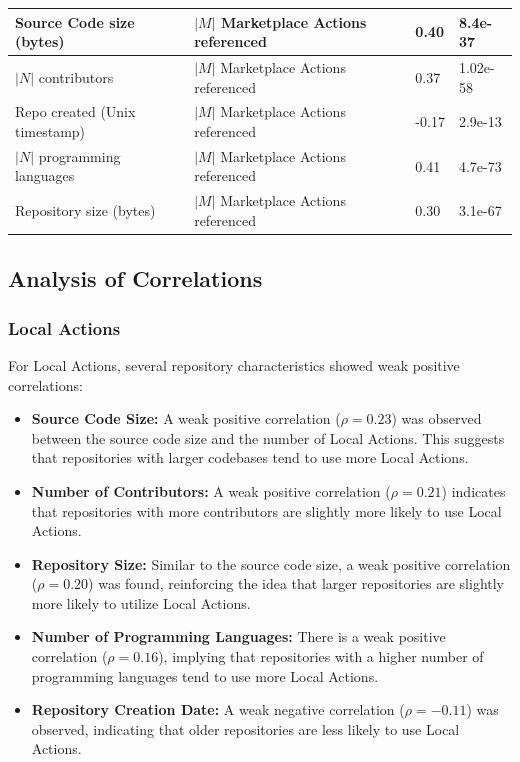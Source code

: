 \documentclass[conference]{IEEEtran}
\begin{document}
\begin{table}[h]
\begin{tabular}{|l|l|l|l|}
            \hline
            Source Code size (bytes) & $|M|$ Marketplace Actions referenced & 0.40 & 8.4e-37\\
            \hline
            $|N|$ contributors & $|M|$ Marketplace Actions referenced & 0.37 & 1.02e-58 \\
            \hline
            Repo created (Unix timestamp) & $|M|$ Marketplace Actions referenced & -0.17 & 2.9e-13 \\
            \hline
            $|N|$ programming languages & $|M|$ Marketplace Actions referenced & 0.41 & 4.7e-73 \\
            \hline
            Repository size (bytes) & $|M|$ Marketplace Actions referenced & 0.30 & 3.1e-67 \\
            \hline
        \end{tabular}
      \end{table}
      
      \subsection{Analysis of Correlations}
      
      \subsubsection{Local Actions}
      For Local Actions, several repository characteristics showed weak positive correlations:
      
      \begin{itemize}
          \item \textbf{Source Code Size:} A weak positive correlation (\(\rho = 0.23\)) was observed between the source code size and the number of Local Actions. This suggests that repositories with larger codebases tend to use more Local Actions.
          \item \textbf{Number of Contributors:} A weak positive correlation (\(\rho = 0.21\)) indicates that repositories with more contributors are slightly more likely to use Local Actions.
          \item \textbf{Repository Size:} Similar to the source code size, a weak positive correlation (\(\rho = 0.20\)) was found, reinforcing the idea that larger repositories are slightly more likely to utilize Local Actions.
          \item \textbf{Number of Programming Languages:} There is a weak positive correlation (\(\rho = 0.16\)), implying that repositories with a higher number of programming languages tend to use more Local Actions.
          \item \textbf{Repository Creation Date:} A weak negative correlation (\(\rho = -0.11\)) was observed, indicating that older repositories are less likely to use Local Actions.\\
      \end{itemize}
      
\end{document}
